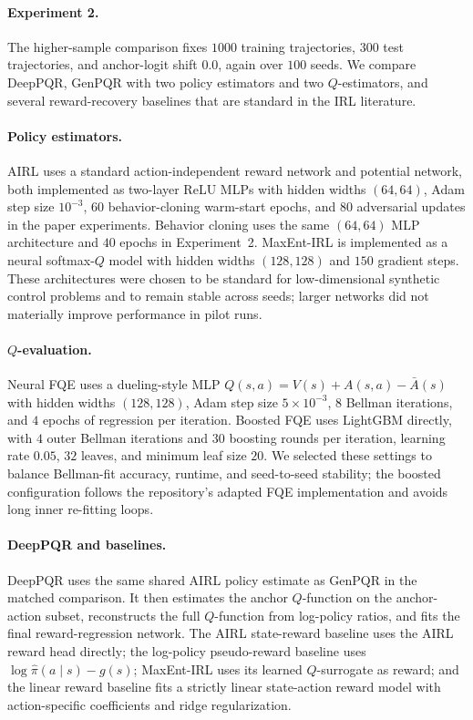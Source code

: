 \documentclass{article}
\newcommand{\1}{\mathbbm{1}}
\begin{document}
\paragraph{Experiment 2.}
The higher-sample comparison fixes \(1000\) training trajectories, \(300\) test
trajectories, and anchor-logit shift \(0.0\), again over \(100\) seeds. We
compare DeepPQR, GenPQR with two policy estimators and two \(Q\)-estimators,
and several reward-recovery baselines that are standard in the IRL literature.

\paragraph{Policy estimators.}
AIRL uses a standard action-independent reward network and potential network,
both implemented as two-layer ReLU MLPs with hidden widths \((64,64)\), Adam
step size \(10^{-3}\), \(60\) behavior-cloning warm-start epochs, and \(80\)
adversarial updates in the paper experiments. Behavior cloning uses the same
\((64,64)\) MLP architecture and \(40\) epochs in Experiment~2. MaxEnt-IRL is
implemented as a neural softmax-\(Q\) model with hidden widths \((128,128)\)
and \(150\) gradient steps. These architectures were chosen to be standard for
low-dimensional synthetic control problems and to remain stable across seeds;
larger networks did not materially improve performance in pilot runs.

\paragraph{\(Q\)-evaluation.}
Neural FQE uses a dueling-style MLP \(Q(s,a)=V(s)+A(s,a)-\bar A(s)\) with
hidden widths \((128,128)\), Adam step size \(5\times 10^{-3}\), \(8\) Bellman
iterations, and \(4\) epochs of regression per iteration. Boosted FQE uses
LightGBM directly, with \(4\) outer Bellman iterations and \(30\) boosting
rounds per iteration, learning rate \(0.05\), \(32\) leaves, and minimum leaf
size \(20\). We selected these settings to balance Bellman-fit accuracy,
runtime, and seed-to-seed stability; the boosted configuration follows the
repository's adapted FQE implementation and avoids long inner re-fitting loops.

\paragraph{DeepPQR and baselines.}
DeepPQR uses the same shared AIRL policy estimate as GenPQR in the matched
comparison. It then estimates the anchor \(Q\)-function on the anchor-action
subset, reconstructs the full \(Q\)-function from log-policy ratios, and fits
the final reward-regression network. The AIRL state-reward baseline uses the
AIRL reward head directly; the log-policy pseudo-reward baseline uses
\(\log \hat\pi(a\mid s)-g(s)\); MaxEnt-IRL uses its learned \(Q\)-surrogate as
reward; and the linear reward baseline fits a strictly linear state-action
reward model with action-specific coefficients and ridge regularization.
\end{document}
